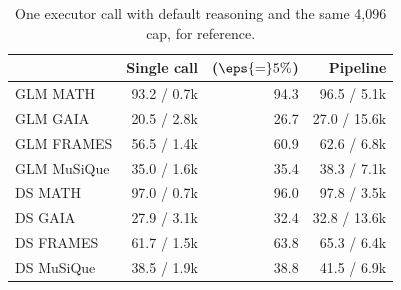 \begin{table}[h]
\centering
\small
\setlength{\tabcolsep}{3pt}
\begin{tabular}{@{}lrrr@{}}
\toprule
& Single call & \climb{} ($\eps{=}5\%$) & Pipeline \\
\midrule
GLM MATH & 93.2 / 0.7k & 94.3 & 96.5 / 5.1k \\
GLM GAIA & 20.5 / 2.8k & 26.7 & 27.0 / 15.6k \\
GLM FRAMES & 56.5 / 1.4k & 60.9 & 62.6 / 6.8k \\
GLM MuSiQue & 35.0 / 1.6k & 35.4 & 38.3 / 7.1k \\
DS MATH & 97.0 / 0.7k & 96.0 & 97.8 / 3.5k \\
DS GAIA & 27.9 / 3.1k & 32.4 & 32.8 / 13.6k \\
DS FRAMES & 61.7 / 1.5k & 63.8 & 65.3 / 6.4k \\
DS MuSiQue & 38.5 / 1.9k & 38.8 & 41.5 / 6.9k \\
\bottomrule
\end{tabular}
\caption{One executor call with default reasoning and the same 4{,}096 cap, for reference.}
\label{tab:single}
\end{table}
